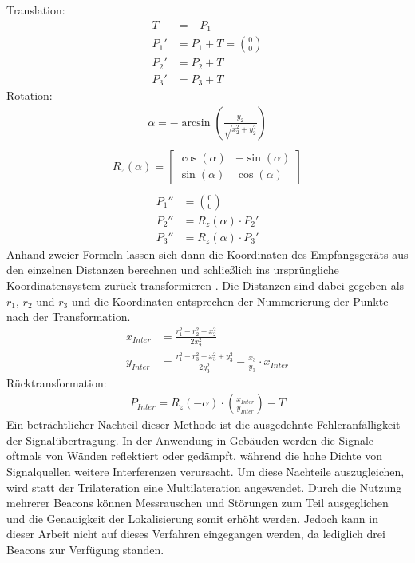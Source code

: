 Translation:
\begin{align*}
T &= -P_1\\
P_1' &= P_1 + T = \binom{0}{0}\\
P_2' &= P_2 + T\\
P_3' &= P_3 + T
\end{align*} 
Rotation:
\begin{align*}
\alpha = -\arcsin \left ( \frac{y_2}{\sqrt{x_2^2+y_2^2}} \right )\\
\end{align*} 
\begin{align*}
R_z\left ( \alpha \right ) = \begin{bmatrix}
\cos\left ( \alpha \right ) & -\sin\left ( \alpha \right )\\ 
\sin\left ( \alpha \right ) & \cos\left ( \alpha \right )
\end{bmatrix}\\
\end{align*}
\begin{align*}
P_1'' &= \binom{0}{0}\\
P_2'' &= R_z\left ( \alpha \right ) \cdot P_2'\\
P_3'' &= R_z\left ( \alpha \right ) \cdot P_3'
\end{align*}
Anhand zweier Formeln lassen sich dann die Koordinaten des Empfangsgeräts aus den einzelnen Distanzen berechnen und schließlich ins ursprüngliche Koordinatensystem zurück transformieren \cite{Trilat}. Die Distanzen sind dabei gegeben als $r_1$, $r_2$ und $r_3$ und die Koordinaten entsprechen der Nummerierung der Punkte nach der Transformation.
\begin{align*}
x_{Inter} &= \frac{r_1^2-r_2^2+x_2^2}{2x_2^2}\\
y_{Inter} &= \frac{r_1^2-r_3^2+x_3^2+y_3^2}{2y_3^2}-\frac{x_3}{y_3}\cdot x_{Inter}
\end{align*}
Rücktransformation:
\begin{align*}
P_{Inter} = R_z\left ( -\alpha \right ) \cdot \binom{x_{Inter}}{y_{Inter}} - T
\end{align*}
Ein beträchtlicher Nachteil dieser Methode ist die ausgedehnte Fehleranfälligkeit der Signalübertragung. In der Anwendung in Gebäuden werden die Signale oftmals von Wänden reflektiert oder gedämpft, während die hohe Dichte von Signalquellen weitere Interferenzen verursacht. Um diese Nachteile auszugleichen, wird statt der Trilateration eine Multilateration angewendet. Durch die Nutzung mehrerer Beacons können Messrauschen und Störungen zum Teil ausgeglichen und die Genauigkeit der Lokalisierung somit erhöht werden. Jedoch kann in dieser Arbeit nicht auf dieses Verfahren eingegangen werden, da lediglich drei Beacons zur Verfügung standen. 
